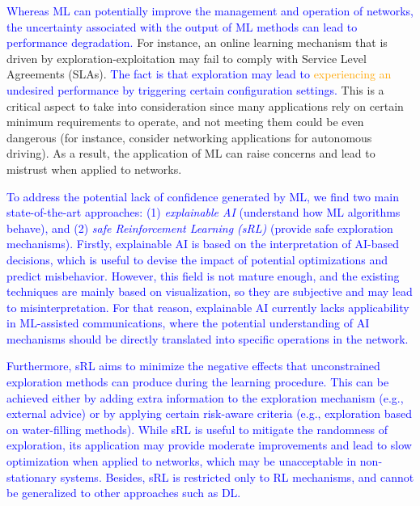 \documentclass[journal]{IEEEtran}
\begin{document}
	\textcolor{blue}{Whereas ML can potentially improve the management and operation of networks, the uncertainty associated with the output of ML methods can lead to performance degradation.} For instance, an online learning mechanism that is driven by exploration-exploitation may fail to comply with Service Level Agreements (SLAs). \textcolor{blue}{The fact is that exploration may lead to \textcolor{orange}{experiencing an} undesired performance by triggering certain configuration settings.} This is a critical aspect to take into consideration since many applications rely on certain minimum requirements to operate, and not meeting them could be even dangerous (for instance, consider networking applications for autonomous driving). As a result, the application of ML can raise concerns and lead to mistrust when applied to networks.
	
	\textcolor{blue}{To address the potential lack of confidence generated by ML, we find two main state-of-the-art approaches: (1) \textit{explainable AI} \cite{samek} (understand how ML algorithms behave), and (2) \textit{safe Reinforcement Learning (sRL)} \cite{safe} (provide safe exploration mechanisms). Firstly, explainable AI is based on the interpretation of AI-based decisions, which is useful to devise the impact of potential optimizations and predict misbehavior. However, this field is not mature enough, and the existing techniques are mainly based on visualization, so they are subjective and may lead to misinterpretation. For that reason, explainable AI currently lacks applicability in ML-assisted communications, where the potential understanding of AI mechanisms should be directly translated into specific operations in the network.}
		
	\textcolor{blue}{Furthermore, sRL aims to minimize the negative effects that unconstrained exploration methods can produce during the learning procedure. This can be achieved either by adding extra information to the exploration mechanism (e.g., external advice) or by applying certain risk-aware criteria (e.g., exploration based on water-filling methods). While sRL is useful to mitigate the randomness of exploration, its application may provide moderate improvements and lead to slow optimization when applied to networks, which may be unacceptable in non-stationary systems. Besides, sRL is restricted only to RL mechanisms, and cannot be generalized to other approaches such as DL.}
\end{document}
